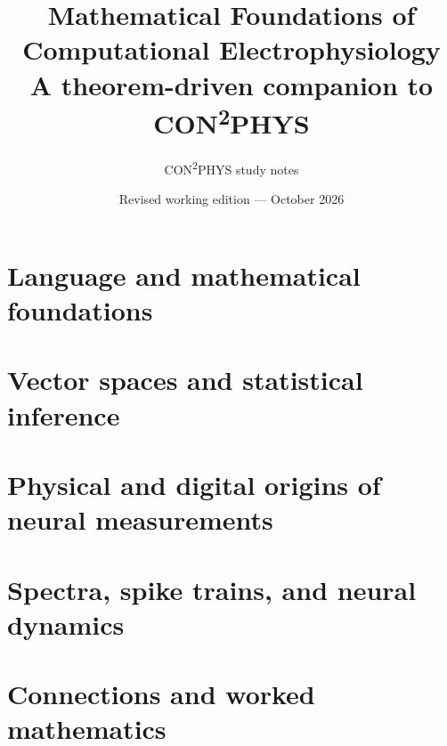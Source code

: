 \documentclass[11pt,a4paper,oneside]{book}
\title{Mathematical Foundations of Computational Electrophysiology\\
\large A theorem-driven companion to CON\textsuperscript{2}PHYS}
\author{CON\textsuperscript{2}PHYS study notes}
\date{Revised working edition --- October 2026}
\begin{document}
\frontmatter
\hypersetup{pageanchor=false}
\maketitle
\hypersetup{pageanchor=true}
\tableofcontents

\mainmatter
\part{Language and mathematical foundations}



\part{Vector spaces and statistical inference}



\part{Physical and digital origins of neural measurements}


\part{Spectra, spike trains, and neural dynamics}











\part{Connections and worked mathematics}



\backmatter


\end{document}
